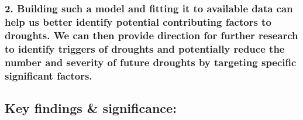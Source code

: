 \documentclass[11pt]{article}
\begin{document}
\hypertarget{building-such-a-model-and-fitting-it-to-available-data-can-help-us-better-identify-potential-contributing-factors-to-droughts.-we-can-then-provide-direction-for-further-research-to-identify-triggers-of-droughts-and-potentially-reduce-the-number-and-severity-of-future-droughts-by-targeting-specific-significant-factors.}{%
\subsubsection{2. Building such a model and fitting it to available data
can help us better identify potential contributing factors to droughts.
We can then provide direction for further research to identify triggers
of droughts and potentially reduce the number and severity of future
droughts by targeting specific significant
factors.}\label{building-such-a-model-and-fitting-it-to-available-data-can-help-us-better-identify-potential-contributing-factors-to-droughts.-we-can-then-provide-direction-for-further-research-to-identify-triggers-of-droughts-and-potentially-reduce-the-number-and-severity-of-future-droughts-by-targeting-specific-significant-factors.}}

    \hypertarget{key-findings-significance}{%
\subsection{Key findings \&
significance:}\label{key-findings-significance}}
\end{document}
